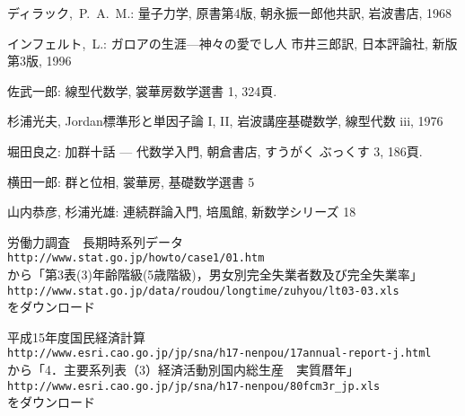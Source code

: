 \documentclass[12pt,twoside]{jarticle}
\begin{document}
\begin{thebibliography}{ABC}

ディラック,~P.~A.~M.:
量子力学, 原書第4版,
朝永振一郎他共訳, 
岩波書店, 1968

インフェルト,~L.:
ガロアの生涯—神々の愛でし人
市井三郎訳, 
日本評論社, 新版第3版, 1996


 佐武一郎: 線型代数学, 裳華房数学選書 1, 324頁.

杉浦光夫, Jordan標準形と単因子論 I, II, 岩波講座基礎数学, 線型代数 iii, 1976


 堀田良之: 加群十話 --- 代数学入門, 朝倉書店, すうがく
ぶっくす 3, 186頁.


横田一郎: 群と位相, 裳華房, 基礎数学選書 5

山内恭彦, 杉浦光雄: 連続群論入門, 培風館, 新数学シリーズ 18

労働力調査　長期時系列データ \\
{\tt http://www.stat.go.jp/howto/case1/01.htm} \\
から「第3表(3)年齢階級(5歳階級)，男女別完全失業者数及び完全失業率」 \\
{\tt http://www.stat.go.jp/data/roudou/longtime/zuhyou/lt03-03.xls} \\
をダウンロード

平成15年度国民経済計算 \\
{\tt http://www.esri.cao.go.jp/jp/sna/h17-nenpou/17annual-report-j.html} \\
から「4．主要系列表（3）経済活動別国内総生産　実質暦年」\\
{\tt http://www.esri.cao.go.jp/jp/sna/h17-nenpou/80fcm3r\verb,_,jp.xls} \\
をダウンロード

\end{thebibliography}

\end{document}
